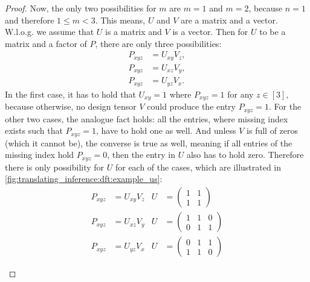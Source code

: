 \begin{proof}
    Now, the only two possibilities for $m$ are $m = 1$ and $m = 2$, because $n = 1$ and therefore $1 \leq m < 3$.
    This means, $U$ and $V$ are a matrix and a vector.
    W.l.o.g. we assume that $U$ is a matrix and $V$ is a vector.
    Then for $U$ to be a matrix and a factor of $P$, there are only three possibilities:
    \begin{align*}
        P_{xyz} & = U_{xy} V_z, \\
        P_{xyz} & = U_{xz} V_y, \\
        P_{xyz} & = U_{yz} V_x.
    \end{align*}
    In the first case, it has to hold that $U_{xy} = 1$ where $P_{xyz} = 1$ for any $z \in [3]$,
    because otherwise, no design tensor $V$ could produce the entry $P_{xyz} = 1$.
    For the other two cases, the analogue fact holds:
    all the entries, where missing index exists such that $P_{xyz} = 1$, have to hold one as well.
    And unless $V$ is full of zeros (which it cannot be), the converse is true as well,
    meaning if all entries of the missing index hold $P_{xyz} = 0$, then the entry in $U$ also has to hold zero.
    Therefore there is only possibility for $U$ for each of the cases, which are illustrated in \autoref{fig:translating_inference:dft:example_us}:
    \begin{align*}
        P_{xyz} & = U_{xy} V_z & U & = \begin{pmatrix} 1 & 1 \\ 1 & 1 \end{pmatrix} \\
        P_{xyz} & = U_{xz} V_y & U & = \begin{pmatrix} 1 & 1 & 0 \\ 0 & 1 & 1 \end{pmatrix} \\
        P_{xyz} & = U_{yz} V_x & U & = \begin{pmatrix} 0 & 1 & 1 \\ 1 & 1 & 0 \end{pmatrix}
    \end{align*}
    \begin{figure}
        \centering
        \begin{subfigure}{0.3\textwidth}
\end{subfigure}
\end{figure}
\end{proof}
